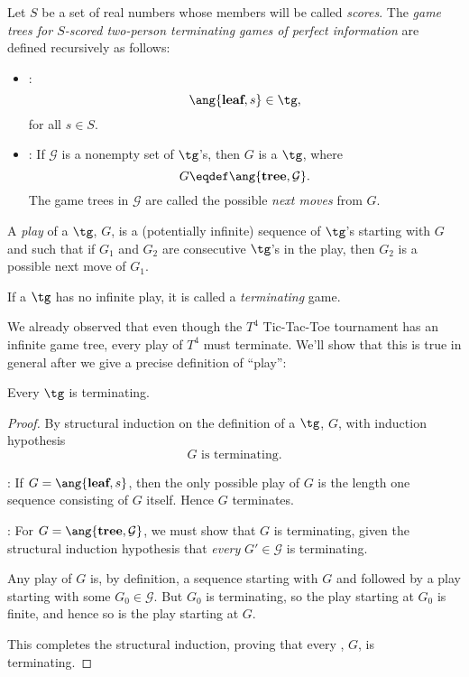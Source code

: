 \begin{definition}\label{tgdef}
  Let $S$ be a set of real numbers whose members will be called
  \emph{scores}. The \emph{game trees for $S$-scored two-person
    terminating games of perfect information} are defined recursively as
  follows:
\begin{itemize}

\item {}:
\[
\ang{\textbf{leaf}, s} \in \tg,
\]
for all $s \in S$.

\item {}:
If $\mathcal{G}$ is a nonempty set of
$\tg$'s, then $G$ is a $\tg$, where
\[
G \eqdef \ang{\textbf{tree},\mathcal{G}}.
\]
The game trees in $\mathcal{G}$ are called the possible \emph{next moves}
from $G$.
\end{itemize}

A \emph{play} of a $\tg$, $G$, is a (potentially infinite) sequence of
$\tg$'s starting with $G$ and such that if $G_1$ and $G_2$ are consecutive
$\tg$'s in the play, then $G_2$ is a possible next move of $G_1$.

If a $\tg$ has no infinite play, it is called a \emph{terminating} game.
\end{definition}

We already observed that even though the $T^4$ Tic-Tac-Toe tournament has
an infinite game tree, every play of $T^4$ must terminate.  We'll show
that this is true in general after we give a precise definition of
``play'':

\begin{theorem}
Every $\tg$ is terminating.
\end{theorem}

\begin{proof}
By structural induction on the definition of a $\tg$, $G$, with induction
hypothesis
\[
G \text{ is terminating}.
\]

: If $G = \ang{\textbf{leaf}, s}$, then the only
possible play of $G$ is the length one sequence consisting of $G$ itself.
Hence $G$ terminates.

: For $G = \ang{\textbf{tree},\mathcal{G}}$, we
must show that $G$ is terminating, given the structural induction
hypothesis that \emph{every} $G' \in \mathcal{G}$ is terminating.

Any play of $G$ is, by definition, a sequence starting with $G$ and
followed by a play starting with some $G_0 \in \mathcal{G}$.  But $G_0$ is
terminating, so the play starting at $G_0$ is finite, and hence so is the
play starting at $G$.

This completes the structural induction, proving that every \tg, $G$, is
terminating.
\end{proof}


